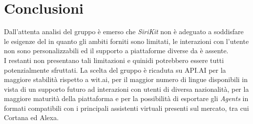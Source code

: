\documentclass[a4paper,titlepage]{article}
\begin{document}
	\section{Conclusioni}
	Dall'attenta analisi del gruppo \GRUPPO{} è emerso che \textit{SiriKit} non è adeguato a soddisfare le esigenze del  \PROGETTO{} in quanto gli ambiti forniti sono limitati, le interazioni con l'utente non sono personalizzabili ed il supporto a piattaforme diverse da  è assente.\\
	I restanti  non presentano tali limitazioni e quinidi potrebbero essere tutti potenzialmente sfruttati. La scelta del gruppo è ricaduta su API.AI per la maggiore stabilità rispetto a wit.ai, per il  maggior numero di lingue disponibili in vista di un supporto futuro ad interazioni con utenti di diversa nazionalità, per la maggiore maturità della piattaforma e per la possibilità di esportare gli \textit{Agents} in formati compatibili con i principali assistenti virtuali presenti sul mercato, tra cui Cortana ed Alexa.
	
	
	
\end{document}
